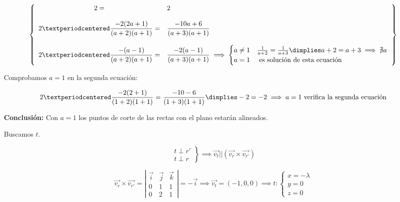 \documentclass[palatino,nosec,nochap,nobuilddate]{Docencia}
\renewcommand{\vec}[1]{\overrightarrow{#1}}
\begin{document}
\begin{problem}
\[
\left\{
	\begin{array}{cl}
		2 =& 2\\\\
		\displaystyle2·\frac{-2(2a+1)}{(a+2)(a+1)} =& \displaystyle\frac{-10a+6}{(a+3)(a+1)}\\\\
		\displaystyle2·\frac{-(a-1)}{(a+2)(a+1)} =& \displaystyle\frac{-2(a-1)}{(a+3)(a+1)} \implies\begin{cases}a\neq 1 &\frac{1}{a+2} = \frac{1}{a+3} \dimplies a+2=a+3 \implies \nexists a\\a=1&\text{ es solución de esta ecuación}\end{cases}
	\end{array}
\right\} 
\]

Comprobamos $a=1$ en la segunda ecuación:

\[
2·\frac{-2(2+1)}{(1+2)(1+1)} = \frac{-10-6}{(1+3)(1+1)} \dimplies -2 = -2 \implies a=1 \text{ verifica la segunda ecuación} 
\]

\textbf{Conclusión: } Con $a=1$ los puntos de corte de las rectas con el plano estarán alineados.


\spart Buscamos $t$.

\[
\left.\begin{array}{c}
	t\perp r'\\
	t\perp r
\end{array}\right\} \implies \vec{v_t} || \left(\vec{v_r}\times\vec{v_{r'}}\right)
\]

\[
\vec{v_r}\times\vec{v_{r'}} = 
\left|\begin{matrix}
\vec{i} & \vec{j} & \vec{k}\\
0&1&1\\
0&2&1
\end{matrix}\right| = -\vec{i} \implies \vec{v_t} = (-1,0,0)\implies
t:\begin{cases}x=-\lambda\\y=0\\z=0\end{cases}\]
\end{problem}
\end{document}
